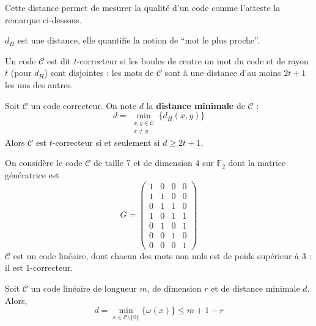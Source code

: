  Cette distance permet de mesurer la qualité d'un code comme l'atteste la remarque ci-dessous.

  \begin{remark}
    $d_H$ est une distance, elle quantifie la notion de ``mot le plus proche''.
  \end{remark}

  \begin{definition}
    Un code $\mathcal{C}$ est dit $t$-correcteur si les boules de centre un mot du code et de rayon $t$ (pour $d_H$) sont disjointes : les mots de $\mathcal{C}$ sont à une distance d'au moins $2t+1$ les uns des autres.
  \end{definition}

  \begin{proposition}
    Soit $\mathcal{C}$ un code correcteur. On note $d$ la \textbf{distance minimale} de $\mathcal{C}$ :
    \[ d = \min_{\substack{x, y \in \mathcal{C} \\ x \neq y}} \{ d_H(x,y) \} \]
    Alors $\mathcal{C}$ est $t$-correcteur si et seulement si $d \geq 2t+1$.
  \end{proposition}

  \begin{example}
    On considère le code $\mathcal{C}$ de taille $7$ et de dimension $4$ sur $\mathbb{F}_2$ dont la matrice génératrice est
    \[
      G =
      \begin{pmatrix}
        1 & 0 & 0 & 0 \\
        1 & 1 & 0 & 0 \\
        0 & 1 & 1 & 0 \\
        1 & 0 & 1 & 1 \\
        0 & 1 & 0 & 1 \\
        0 & 0 & 1 & 0 \\
        0 & 0 & 0 & 1
      \end{pmatrix}
    \]
    $\mathcal{C}$ est un code linéaire, dont chacun des mots non nuls est de poids supérieur à $3$ : il est $1$-correcteur.
  \end{example}

  \begin{proposition}
    Soit $\mathcal{C}$ un code linéaire de longueur $m$, de dimension $r$ et de distance minimale $d$. Alors,
    \[ d = \min_{x \in \mathcal{C} \setminus \{ 0 \}} \{ \omega(x) \} \leq m+1-r \]
  \end{proposition}

  \annexessection

